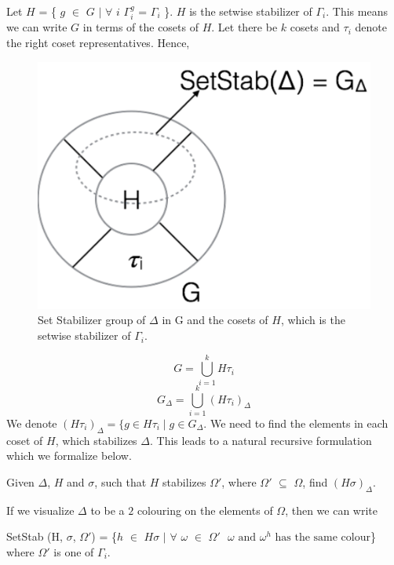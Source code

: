 Let $H$ = \{ $g$ $\in$ $G$ $|$ $\forall$ $i$ $\Gamma_{i}^{g}$ = $\Gamma_{i}$ 
\}. $H$ is the setwise stabilizer of $\Gamma_{i}$. This means we can write $G$ 
in terms of the cosets of $H$. Let there be $k$ cosets and $\tau_i$ denote the 
right coset representatives. Hence,
\begin{figure}[htp!]
	\centering
	\includegraphics[scale=0.45]{images/setstabgroup.pdf}
	\caption{Set Stabilizer group of $\Delta$ in G and the cosets of $H$, which is the setwise stabilizer of $\Gamma_{i}$.}
	\label{fig:setstabgroup}
\end{figure}

\[ G =  \bigcup_{i=1}^kH\tau_{i} \]
\[ G_{\Delta} = \bigcup_{i=1}^k(H\tau_{i})_{\Delta} \]
We denote $(H\tau_i)_{\Delta} = \{g \in H\tau_i \mid g \in G_{\Delta}$.
We need to find the elements in each coset of $H$, which stabilizes $\Delta$. This leads to a natural recursive formulation which we formalize below. 

\begin{problem}
Given $\Delta$, $H$ and $\sigma$, such that $H$ stabilizes $\Omega'$, where $\Omega'$ $\subseteq$ $\Omega$, find $(H\sigma)_{\Delta}$. 
\end{problem}
If we visualize $\Delta$ to be a $2$ colouring on the elements of $\Omega$, then we can write
\begin{center}
SetStab (H, $\sigma$, $\Omega'$) = \{$h$ $\in$ $H\sigma$ $|$ $\forall$ $\omega$ $\in$ $\Omega' \text{ $\omega$ and $\omega^{h}$ has the same colour}$\}
where $\Omega'$ is one of $\Gamma_{i}$.
\end{center}

